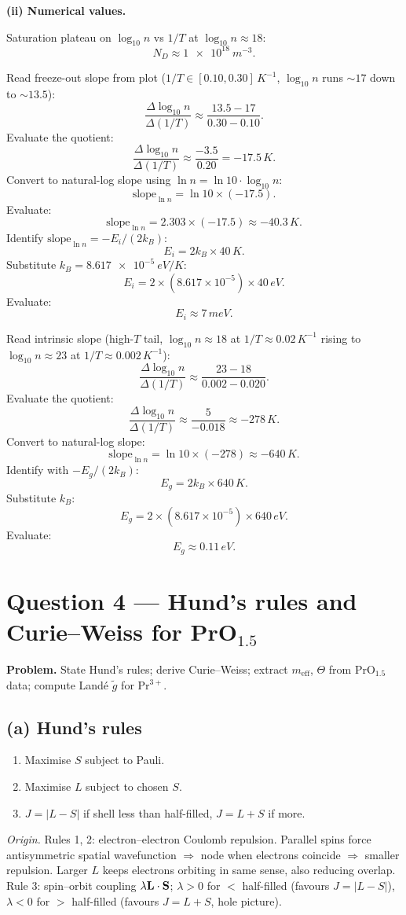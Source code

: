 \documentclass[11pt]{article}
\begin{document}
\textbf{(ii) Numerical values.}

Saturation plateau on $\log_{10}n$ vs $1/T$ at $\log_{10}n\approx 18$:
\[ \boxed{\;N_D\approx \SI{1e18}{m^{-3}}.\;} \]

Read freeze-out slope from plot ($1/T\in[0.10,0.30]\,\si{K^{-1}}$, $\log_{10}n$ runs $\sim 17$ down to $\sim 13.5$):
\[ \frac{\Delta\log_{10}n}{\Delta(1/T)}\approx\frac{13.5-17}{0.30-0.10}. \]
Evaluate the quotient:
\[ \frac{\Delta\log_{10}n}{\Delta(1/T)}\approx\frac{-3.5}{0.20}=-17.5\,\si{K}. \]
Convert to natural-log slope using $\ln n=\ln 10\cdot\log_{10}n$:
\[ \text{slope}_{\ln n}=\ln 10\times(-17.5). \]
Evaluate:
\[ \text{slope}_{\ln n}=2.303\times(-17.5)\approx -40.3\,\si{K}. \]
Identify $\text{slope}_{\ln n}=-E_i/(2k_B)$:
\[ E_i=2k_B\times 40\,\si{K}. \]
Substitute $k_B=\SI{8.617e-5}{eV/K}$:
\[ E_i=2\times(8.617\times 10^{-5})\times 40\,\si{eV}. \]
Evaluate:
\[ \boxed{\;E_i\approx 7\,\si{meV}.\;} \]

Read intrinsic slope (high-$T$ tail, $\log_{10}n\approx 18$ at $1/T\approx 0.02\,\si{K^{-1}}$ rising to $\log_{10}n\approx 23$ at $1/T\approx 0.002\,\si{K^{-1}}$):
\[ \frac{\Delta\log_{10}n}{\Delta(1/T)}\approx\frac{23-18}{0.002-0.020}. \]
Evaluate the quotient:
\[ \frac{\Delta\log_{10}n}{\Delta(1/T)}\approx\frac{5}{-0.018}\approx -278\,\si{K}. \]
Convert to natural-log slope:
\[ \text{slope}_{\ln n}=\ln 10\times(-278)\approx -640\,\si{K}. \]
Identify with $-E_g/(2k_B)$:
\[ E_g=2k_B\times 640\,\si{K}. \]
Substitute $k_B$:
\[ E_g=2\times(8.617\times 10^{-5})\times 640\,\si{eV}. \]
Evaluate:
\[ \boxed{\;E_g\approx 0.11\,\si{eV}.\;} \]

\section*{Question 4 --- Hund's rules and Curie--Weiss for PrO$_{1.5}$}

\textbf{Problem.} State Hund's rules; derive Curie--Weiss; extract $m_{\text{eff}}$, $\Theta$ from PrO$_{1.5}$ data; compute Land\'e $\tilde g$ for Pr$^{3+}$.

\subsection*{(a) Hund's rules}

\begin{enumerate}
\item Maximise $S$ subject to Pauli.
\item Maximise $L$ subject to chosen $S$.
\item $J=|L-S|$ if shell less than half-filled, $J=L+S$ if more.
\end{enumerate}
\emph{Origin.} Rules 1, 2: electron--electron Coulomb repulsion. Parallel spins force antisymmetric spatial wavefunction $\Rightarrow$ node when electrons coincide $\Rightarrow$ smaller repulsion. Larger $L$ keeps electrons orbiting in same sense, also reducing overlap. Rule 3: spin--orbit coupling $\lambda\vb L\cdot\vb S$; $\lambda>0$ for $<$ half-filled (favours $J=|L-S|$), $\lambda<0$ for $>$ half-filled (favours $J=L+S$, hole picture).
\end{document}

